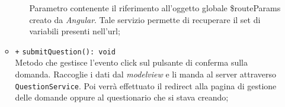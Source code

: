 \begin{itemize}
\begin{itemize}
\begin{itemize}
			Parametro contenente il riferimento all'oggetto globale \$routeParams creato da \textit{Angular}. Tale servizio permette di recuperare il set di variabili presenti nell'url; 
		\end{itemize}
		\item \texttt{+} \texttt{submitQuestion(): void}\\ 
		Metodo che gestisce l’evento click sul pulsante di conferma sulla domanda. Raccoglie i dati dal \textit{modelview} e li manda al server attraverso \texttt{QuestionService}. Poi verrà effettuato il redirect alla pagina di gestione delle domande oppure al questionario che si stava creando; 
	\end{itemize}

\end{itemize}

